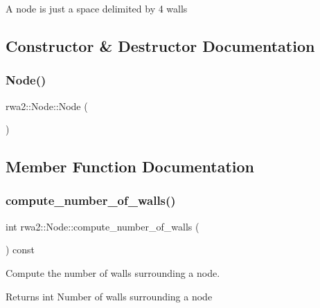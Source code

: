 A node is just a space delimited by 4 walls 

\subsection{Constructor \& Destructor Documentation}
\mbox{\label{classrwa2_1_1_node_abc9f6033393b7beee29ea7882a897582}} 
\subsubsection{\texorpdfstring{Node()}{Node()}}
{\footnotesize\ttfamily rwa2\+::\+Node\+::\+Node (\begin{DoxyParamCaption}{ }\end{DoxyParamCaption})\hspace{0.3cm}{\ttfamily [inline]}}



\subsection{Member Function Documentation}
\mbox{\label{classrwa2_1_1_node_a6057b0b97f6b815a57aad534cd021674}} 
\subsubsection{\texorpdfstring{compute\+\_\+number\+\_\+of\+\_\+walls()}{compute\_number\_of\_walls()}}
{\footnotesize\ttfamily int rwa2\+::\+Node\+::compute\+\_\+number\+\_\+of\+\_\+walls (\begin{DoxyParamCaption}{ }\end{DoxyParamCaption}) const}



Compute the number of walls surrounding a node. 

\begin{DoxyReturn}{Returns}
int Number of walls surrounding a node 
\end{DoxyReturn}
\mbox{\label{classrwa2_1_1_node_acd6ab64157b7b60bea708ddb52ddb1a8}} 
